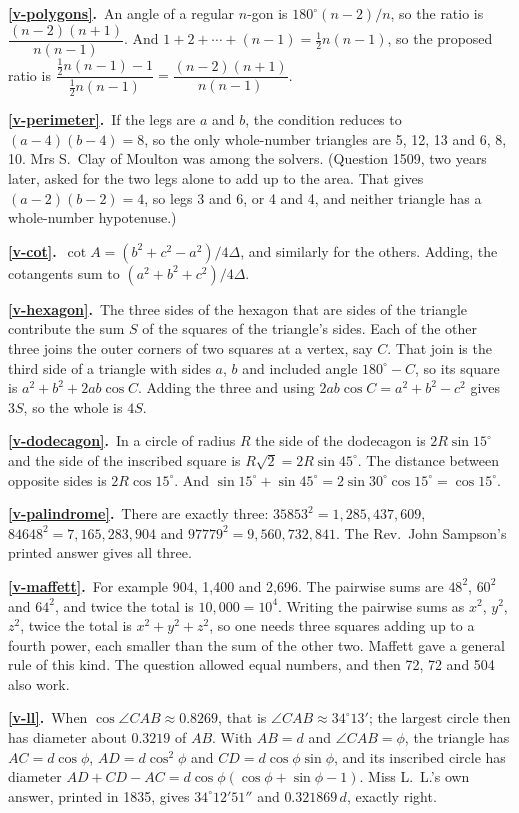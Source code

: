 \documentclass[11pt,a4paper]{article}
\newcommand{\ans}[2]{\par\smallskip\noindent\textbf{\ref{#1}.}\ #2}
\begin{document}
\ans{v-polygons}{An angle of a regular $n$-gon is $180^\circ(n-2)/n$, so the ratio is
$\dfrac{(n-2)(n+1)}{n(n-1)}$. And $1 + 2 + \cdots + (n-1) = \tfrac12n(n-1)$, so the
proposed ratio is $\dfrac{\frac12n(n-1) - 1}{\frac12n(n-1)} = \dfrac{(n-2)(n+1)}{n(n-1)}$.}

\ans{v-perimeter}{If the legs are $a$ and $b$, the condition reduces to
$(a - 4)(b - 4) = 8$, so the only whole-number triangles are 5, 12, 13 and 6, 8, 10. Mrs
S.~Clay of Moulton was among the solvers. (Question 1509, two years later, asked for the
two legs alone to add up to the area. That gives $(a-2)(b-2) = 4$, so legs 3 and 6, or 4
and 4, and neither triangle has a whole-number hypotenuse.)}

\ans{v-cot}{$\cot A = (b^2 + c^2 - a^2)/4\Delta$, and similarly for the others. Adding, the
cotangents sum to $(a^2 + b^2 + c^2)/4\Delta$.}

\ans{v-hexagon}{The three sides of the hexagon that are sides of the triangle contribute
the sum $S$ of the squares of the triangle's sides. Each of the other three joins the outer
corners of two squares at a vertex, say $C$. That join is the third side of a triangle with
sides $a$, $b$ and included angle $180^\circ - C$, so its square is
$a^2 + b^2 + 2ab\cos C$. Adding the three and using $2ab\cos C = a^2 + b^2 - c^2$ gives
$3S$, so the whole is $4S$.}

\ans{v-dodecagon}{In a circle of radius $R$ the side of the dodecagon is $2R\sin15^\circ$ and
the side of the inscribed square is $R\sqrt2 = 2R\sin45^\circ$. The distance between
opposite sides is $2R\cos15^\circ$. And $\sin15^\circ + \sin45^\circ =
2\sin30^\circ\cos15^\circ = \cos15^\circ$.}

\ans{v-palindrome}{There are exactly three: $35853^2 = 1{,}285{,}437{,}609$,
$84648^2 = 7{,}165{,}283{,}904$ and $97779^2 = 9{,}560{,}732{,}841$. The Rev.~John Sampson's
printed answer gives all three.}

\ans{v-maffett}{For example 904, 1,400 and 2,696. The pairwise sums are $48^2$, $60^2$ and
$64^2$, and twice the total is $10{,}000 = 10^4$. Writing the pairwise sums as $x^2$, $y^2$,
$z^2$, twice the total is $x^2 + y^2 + z^2$, so one needs three squares adding up to a
fourth power, each smaller than the sum of the other two. Maffett gave a general rule of
this kind. The question allowed equal numbers, and then 72, 72 and 504 also work.}

\ans{v-ll}{When $\cos\angle CAB \approx 0.8269$, that is $\angle CAB \approx 34^\circ13'$; the
largest circle then has diameter about $0.3219$ of $AB$. With $AB = d$ and
$\angle CAB = \phi$, the triangle has $AC = d\cos\phi$, $AD = d\cos^2\phi$ and
$CD = d\cos\phi\sin\phi$, and its inscribed circle has diameter
$AD + CD - AC = d\cos\phi(\cos\phi + \sin\phi - 1)$. Miss L.~L.'s own answer, printed in
1835, gives $34^\circ12'51''$ and $0.321869\,d$, exactly right.}
\end{document}
